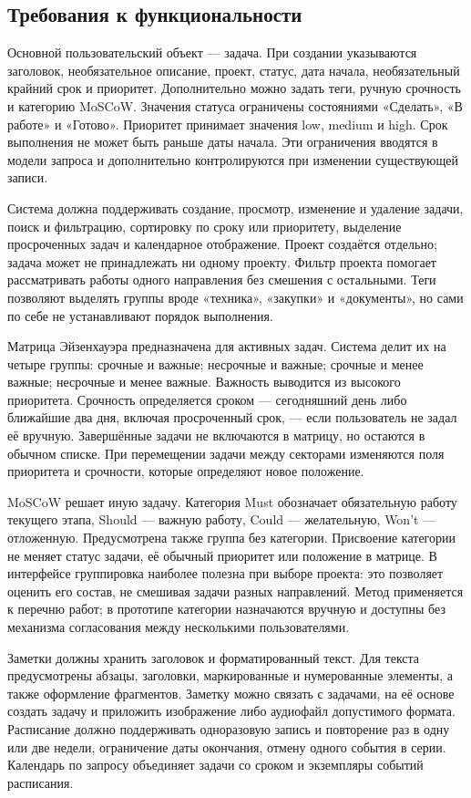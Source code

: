 \documentclass[14pt,a4paper]{extarticle}
\begin{document}
\subsection{Требования к функциональности}

Основной пользовательский объект --- задача. При создании указываются заголовок, необязательное описание, проект, статус, дата начала, необязательный крайний срок и приоритет. Дополнительно можно задать теги, ручную срочность и категорию MoSCoW. Значения статуса ограничены состояниями «Сделать», «В работе» и «Готово». Приоритет принимает значения low, medium и high. Срок выполнения не может быть раньше даты начала. Эти ограничения вводятся в модели запроса и дополнительно контролируются при изменении существующей записи.

Система должна поддерживать создание, просмотр, изменение и удаление задачи, поиск и фильтрацию, сортировку по сроку или приоритету, выделение просроченных задач и календарное отображение. Проект создаётся отдельно; задача может не принадлежать ни одному проекту. Фильтр проекта помогает рассматривать работы одного направления без смешения с остальными. Теги позволяют выделять группы вроде «техника», «закупки» и «документы», но сами по себе не устанавливают порядок выполнения.

Матрица Эйзенхауэра предназначена для активных задач. Система делит их на четыре группы: срочные и важные; несрочные и важные; срочные и менее важные; несрочные и менее важные. Важность выводится из высокого приоритета. Срочность определяется сроком --- сегодняшний день либо ближайшие два дня, включая просроченный срок, --- если пользователь не задал её вручную. Завершённые задачи не включаются в матрицу, но остаются в обычном списке. При перемещении задачи между секторами изменяются поля приоритета и срочности, которые определяют новое положение.

MoSCoW решает иную задачу. Категория Must обозначает обязательную работу текущего этапа, Should --- важную работу, Could --- желательную, Won't --- отложенную. Предусмотрена также группа без категории. Присвоение категории не меняет статус задачи, её обычный приоритет или положение в матрице. В интерфейсе группировка наиболее полезна при выборе проекта: это позволяет оценить его состав, не смешивая задачи разных направлений. Метод применяется к перечню работ; в прототипе категории назначаются вручную и доступны без механизма согласования между несколькими пользователями.

Заметки должны хранить заголовок и форматированный текст. Для текста предусмотрены абзацы, заголовки, маркированные и нумерованные элементы, а также оформление фрагментов. Заметку можно связать с задачами, на её основе создать задачу и приложить изображение либо аудиофайл допустимого формата. Расписание должно поддерживать одноразовую запись и повторение раз в одну или две недели, ограничение даты окончания, отмену одного события в серии. Календарь по запросу объединяет задачи со сроком и экземпляры событий расписания.
\end{document}
